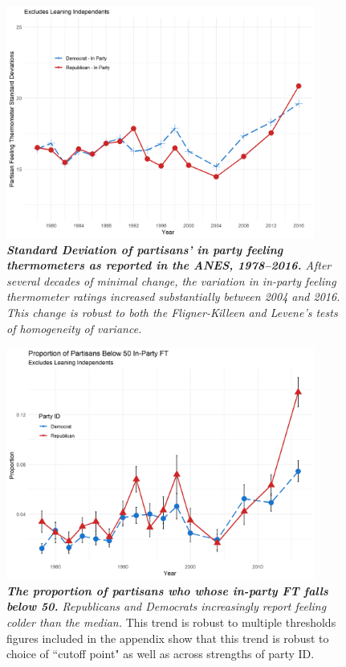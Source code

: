 \documentclass[12pt]{paper}
\begin{document}
\begin{figure}[H]
\center\includegraphics[width=4in]{cdf-sd.png}
\caption{\label{fig:cdf-sd} \textit{\textbf{Standard Deviation of partisans' in party feeling thermometers as reported in the ANES, 1978--2016.} After several decades of minimal change, the variation in in-party feeling thermometer ratings increased substantially between 2004 and 2016. This change is robust to both the Fligner-Killeen and Levene's tests of homogeneity of variance.}}
\end{figure}


\begin{figure}[H]
\center\includegraphics[width=4in]{cdf-below-50.png}
\caption{\label{fig:cdf-below-50} \textit{\textbf{The proportion of partisans who whose in-party FT falls below 50.} Republicans and Democrats increasingly report feeling colder than the median.} This trend is robust to multiple thresholds figures included in the appendix show that this trend is robust to choice of ``cutoff point" as well as across strengths of party ID. }
\end{figure}
\end{document}
